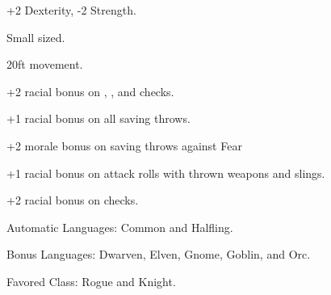 
\begin{itemize*}
\item +2 Dexterity, -2 Strength.
\item Small sized.
\item 20ft movement.
\item +2 racial bonus on , , and  checks.
\item +1 racial bonus on all saving throws.
\item +2 morale bonus on saving throws against Fear
\item +1 racial bonus on attack rolls with thrown weapons and slings.
\item +2 racial bonus on  checks.
\item Automatic Languages: Common and Halfling.
\item Bonus Languages: Dwarven, Elven, Gnome, Goblin, and Orc.
\item Favored Class: Rogue and Knight.
\end{itemize*}

